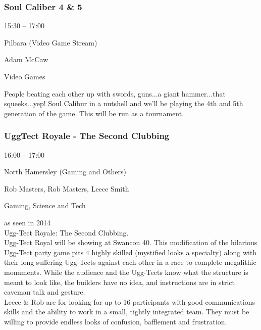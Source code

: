 \documentclass{scrreprt}
\begin{document}
\begin{multicols}{2}
\subsubsection*{Soul Caliber 4 \& 5}\begin{description}
\setlength{\itemsep}{0pt}
\setlength{\parsep}{0pt}
\setlength{\parskip}{0pt}
\item[Time:]{15:30 -- 17:00}
\item[Venue:]{Pilbara (Video Game Stream)}
\item[People:]{Adam McCaw}
\item[Tags:]{Video Games}\end{description}
People beating each other up with swords, guns...a giant hammer...that squeeks...yep! Soul Calibur in a nutshell and we'll be playing the 4th and 5th generation of the game. This will be run as a tournament.
\subsubsection*{UggTect Royale - The Second Clubbing}\begin{description}
\setlength{\itemsep}{0pt}
\setlength{\parsep}{0pt}
\setlength{\parskip}{0pt}
\item[Time:]{16:00 -- 17:00}
\item[Venue:]{North Hamersley (Gaming and Others)}
\item[People:]{Rob Masters, Rob Masters, Leece Smith}
\item[Tags:]{Gaming, Science and Tech}\end{description}
as seen in 2014\\Ugg-Tect Royale: The Second Clubbing.\\ Ugg-Tect Royal will be showing at Swancon 40. This modification of the hilarious Ugg-Tect party game pits 4 highly skilled (mystified looks a specialty) along with their long suffering Ugg-Tects against each other in a race to complete megalithic monuments. While the audience and the Ugg-Tects know what the structure is meant to look like, the builders have no idea, and instructions are in strict caveman talk and gesture.\\Leece \& Rob are for looking for up to 16 participants with good communications skills and the ability to work in a small, tightly integrated team. They must be willing to provide endless looks of confusion, bafflement and frustration.

\end{multicols}
\end{document}
